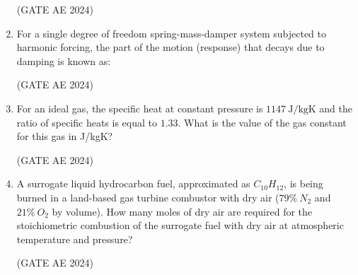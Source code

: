 \documentclass[journal,12pt,onecolumn]{IEEEtran}
\theoremstyle{remark}
\begin{document}
\begin{enumerate}
\begin{enumerate}
\end{enumerate}
\hfill(GATE AE 2024)

\item 
For a single degree of freedom spring-mass-damper system subjected to harmonic forcing, the part of the motion (response) that decays due to damping is known as:  
\begin{enumerate}
\end{enumerate}
\hfill(GATE AE 2024)


\item For an ideal gas, the specific heat at constant pressure is $1147 \ \text{J/kgK}$ and the ratio of specific heats is equal to $1.33$. What is the value of the gas constant for this gas in J/kgK?  
\begin{enumerate}
\end{enumerate}
\hfill(GATE AE 2024)

\item A surrogate liquid hydrocarbon fuel, approximated as $C_{10}H_{12}$, is being burned in a 
land-based gas turbine combustor with dry air ($79\% \ N_2$ and $21\% \ O_2$ by volume).  
How many moles of dry air are required for the stoichiometric combustion of the surrogate 
fuel with dry air at atmospheric temperature and pressure?  

\begin{enumerate}
\end{enumerate}
\hfill(GATE AE 2024)


\end{enumerate}
\end{document}
